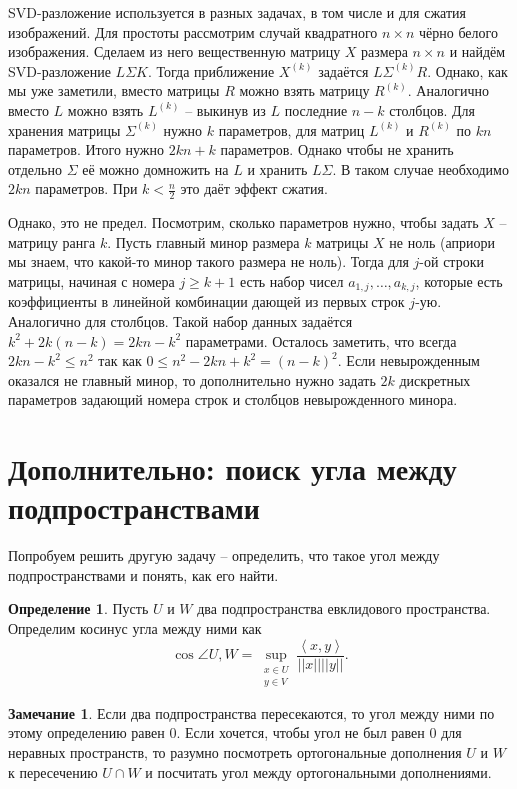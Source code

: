 \documentclass[10pt,a4paper,oneside]{book}
\theoremstyle{definition}
\newtheorem*{rem}{Замечание}
\newtheorem*{defn}{{\color{yellow!30!red} Определение}}
\def\lan{\left\langle }
\def\ran{\right\rangle}
\def\dfn{\begin{defn}}
\def\edfn{\end{defn}}
\def\rm{\begin{rem}}
\def\erm{\end{rem}}
\begin{document}
SVD-разложение используется в разных задачах, в том числе и для сжатия изображений.  Для простоты рассмотрим случай квадратного $n \times n$ чёрно белого изображения. Сделаем из него вещественную матрицу $X$ размера $n \times n$ и найдём SVD-разложение $L \Sigma K$. Тогда приближение $X^{(k)}$ задаётся $L\Sigma^{(k)}R$. Однако, как мы уже заметили, вместо матрицы $R$ можно взять матрицу $R^{(k)}$. Аналогично вместо $L$ можно взять $L^{(k)}$ -- выкинув из $L$ последние $n-k$ столбцов. Для хранения матрицы $\Sigma^{(k)}$ нужно $k$ параметров, для матриц $L^{(k)}$ и $R^{(k)}$ по $kn$ параметров. Итого нужно $2kn+k$ параметров. Однако чтобы не хранить отдельно $\Sigma$ её можно домножить на $L$ и хранить $L\Sigma$. В таком случае необходимо $2kn$ параметров. При $k<\frac{n}{2}$ это даёт эффект сжатия. 

Однако, это не предел. Посмотрим, сколько параметров нужно, чтобы задать $X$ -- матрицу ранга $k$. Пусть главный минор размера $k$ матрицы $X$ не ноль (априори мы знаем, что какой-то минор такого размера не ноль). Тогда для $j$-ой строки матрицы, начиная с номера $j \geq k+1$ есть набор чисел $a_{1,j},\dots,a_{k,j}$, которые есть коэффициенты в линейной комбинации дающей из первых строк $j$-ую. Аналогично для столбцов. Такой набор данных задаётся $k^2+ 2k(n-k)=2kn-k^2$ параметрами. Осталось заметить, что всегда $2kn - k^2\leq n^2$ так как $0\leq n^2-2kn+k^2=(n-k)^2$. Если невырожденным оказался не главный минор, то дополнительно нужно задать $2k$ дискретных параметров задающий номера строк и столбцов невырожденного минора.



\section*{Дополнительно: поиск угла между подпространствами}
Попробуем решить другую задачу -- определить, что такое угол между подпространствами и понять, как его найти. 

\dfn
Пусть $U$ и $W$ два подпространства  евклидового пространства. Определим косинус угла между ними как 
$$\cos \angle U,W= \sup_{\substack{ x\in U\\ y\in V}} \frac{\lan x,y\ran}{||x|| ||y||}.$$
\edfn

\rm Если два подпространства пересекаются, то угол между ними по этому определению равен 0. Если хочется, чтобы угол не был равен 0 для неравных пространств, то разумно посмотреть ортогональные дополнения $U$ и $W$ к пересечению $U\cap W$ и посчитать угол между ортогональными дополнениями. 
\erm
\end{document}
